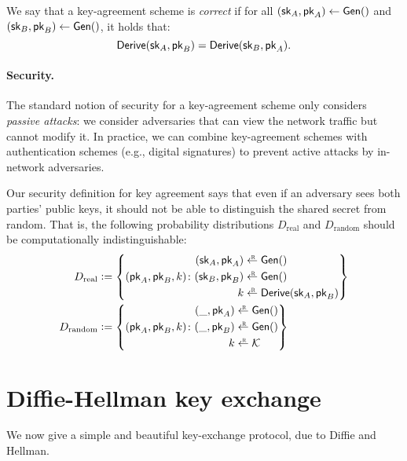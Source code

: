 \begin{definition}
We say that a key-agreement scheme is \emph{correct} if
for all 
$({\mathsf{sk}}_A, \mathsf{pk}_A) \gets \mathsf{Gen}()$ and
$({\mathsf{sk}}_B, \mathsf{pk}_B) \gets \mathsf{Gen}()$, it holds that: 
\[ \mathsf{Derive}({\mathsf{sk}}_A, \mathsf{pk}_B) = \mathsf{Derive}({\mathsf{sk}}_B, \mathsf{pk}_A). \]
\end{definition}

\paragraph{Security.}
The standard notion of security for a key-agreement scheme
only considers \emph{passive attacks}:
we consider adversaries that can view the
network traffic but cannot modify it.
In practice, we can combine key-agreement
schemes with authentication schemes (e.g., digital signatures)
to prevent active attacks by in-network adversaries.

Our security definition for key agreement says that even
if an adversary sees both parties' public keys, it should
not be able to distinguish the shared secret from random.
That is, the following probability distributions
$D_\text{real}$ and $D_\text{random}$ should be 
computationally indistinguishable:
\begin{align*}
  D_\text{real} &\deq \left\{ 
(\pk_A, \pk_B, k) \colon  \begin{aligned}
  (\sk_A, \pk_A) &\getsr \Gen()\\
  (\sk_B, \pk_B) &\getsr \Gen()\\
  k &\getsr \Derive(\sk_A, \pk_B)
\end{aligned}
\right\} \\
  D_\text{random} &\deq \left\{ (\pk_A, \pk_B, k) \colon  \begin{aligned}
  (\_, \pk_A) &\getsr \Gen()\\
  (\_, \pk_B) &\getsr \Gen()\\
  k &\getsr \calK 
\end{aligned}
  \right\}
\end{align*}


\section{Diffie-Hellman key exchange}\label{sec:dh}
We now give a simple and beautiful key-exchange protocol, 
due to Diffie and Hellman.

